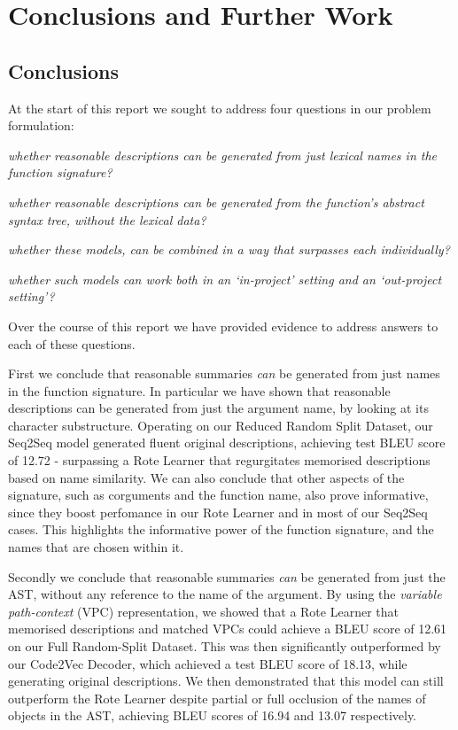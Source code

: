 \chapter{Conclusions and Further Work}
\label{chapterlabel4}


\section{Conclusions}

At the start of this report we sought to address four questions in our problem formulation:

\begin{tight_enumerate}
    \item \textit{whether reasonable descriptions can be generated from just lexical names in the function signature?}
    \item \textit{whether reasonable descriptions can be generated from the function's abstract syntax tree, without the lexical data?}
    \item \textit{whether these models, can be combined in a way that surpasses each individually?}
    \item \textit{whether such models can work both in an `in-project' setting and an `out-project setting'?}
\end{tight_enumerate}

Over the course of this report we have provided evidence to address answers to each of these questions. 

First we conclude that reasonable summaries \textit{can} be generated from just names in the function signature. 
In particular we have shown that reasonable descriptions can be generated from just the argument name, by looking at its character substructure. Operating on our Reduced Random Split Dataset, our Seq2Seq model generated fluent original descriptions, achieving test BLEU score of 12.72 - surpassing a Rote Learner that regurgitates memorised descriptions based on name similarity.  
We can also conclude that other aspects of the signature, such as corguments and the function name, also prove informative, since they boost perfomance in our Rote Learner and in most of our Seq2Seq cases. 
This highlights the informative power of the function signature, and the names that are chosen within it.

Secondly we conclude that reasonable summaries \textit{can} be generated from just the AST, without any reference to the name of the argument. 
By using the \textit{variable path-context} (VPC) representation, we showed that a Rote Learner that memorised descriptions and matched VPCs could achieve a BLEU score of 12.61 on our Full Random-Split Dataset. This was then significantly outperformed by our Code2Vec Decoder, which achieved a test BLEU score of 18.13, while generating original descriptions. 
We then demonstrated that this model can still outperform the Rote Learner despite partial or full occlusion of the names of objects in the AST, achieving BLEU scores of 16.94 and 13.07 respectively.

